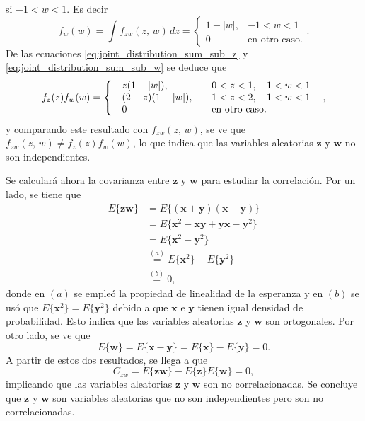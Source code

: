 \documentclass[a4paper]{report}
\newcommand{\x}{\mathbf{x}}
\newcommand{\y}{\mathbf{y}}
\newcommand{\w}{\mathbf{w}}
\newcommand{\z}{\mathbf{z}}
\begin{document}
si \(-1<w<1\). Es decir
\begin{equation}\label{eq:joint_distribution_sum_sub_w}
f_w(w)=\int f_{zw}(z,\,w)\,dz
 =\left\{\begin{array}{ll}
   1-|w|, &  -1<w<1\\
   0 & \textrm{en otro caso.}
 \end{array} \right..
\end{equation}
De las ecuaciones \ref{eq:joint_distribution_sum_sub_z} y \ref{eq:joint_distribution_sum_sub_w} se deduce que
\[
 f_z(z)f_w(w)=
\arraycolsep=10pt
 \left\{\begin{array}{ll}
   z(1-|w|), &  0<z<1,\,-1<w<1\\
   (2-z)(1-|w|), & 1<z<2,\,-1<w<1\\
   0 & \textrm{en otro caso.}
 \end{array} \right., 
\]
y comparando este resultado con \(f_{zw}(z,\,w)\), se ve que \(f_{zw}(z,\,w)\neq f_z(z)f_w(w)\), lo que indica que las variables aleatorias \(\z\) y \(\w\) no son independientes.

Se calculará ahora la covarianza entre \(\z\) y \(\w\) para estudiar la correlación. Por un lado, se tiene que
\begin{align*}
 E\{\z\w\}&=E\{(\x+\y)(\x-\y)\}\\
   &=E\{\x^2-\x\y+\y\x-\y^2\}\\
   &=E\{\x^2-\y^2\}\\
   &\overset{(a)}{=}E\{\x^2\}-E\{\y^2\}\\
   &\overset{(b)}{=}0,
\end{align*}
donde en \((a)\) se empleó la propiedad de linealidad de la esperanza y en \((b)\) se usó que \(E\{\x^2\}=E\{\y^2\}\) debido a que \(\x\) e \(\y\) tienen igual densidad de probabilidad. Esto indica que las variables aleatorias \(\z\) y \(\w\) son ortogonales. Por otro lado, se ve que
\[
 E\{\w\}=E\{\x-\y\}=E\{\x\}-E\{\y\}=0.
\]
A partir de estos dos resultados, se llega a que
\[
 C_{zw}=E\{\z\w\}-E\{\z\}E\{\w\}=0,
\]
implicando que las variables aleatorias \(\z\) y \(\w\) son no correlacionadas. Se concluye que \(\z\) y \(\w\) son variables aleatorias que no son independientes pero son no correlacionadas.
\end{document}
